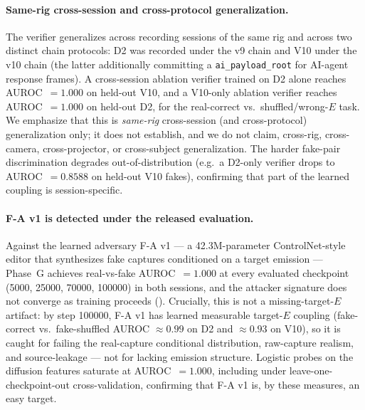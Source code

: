 \paragraph{Same-rig cross-session and cross-protocol generalization.}
The verifier generalizes across recording sessions of the same rig and across two distinct chain protocols: D2 was recorded under the v9 chain and V10 under the v10 chain (the latter additionally committing a \texttt{ai\_payload\_root} for AI-agent response frames). A cross-session ablation verifier trained on D2 alone reaches AUROC~$=1.000$ on held-out V10, and a V10-only ablation verifier reaches AUROC~$=1.000$ on held-out D2, for the real-correct vs.\ shuffled/wrong-$E$ task. We emphasize that this is \emph{same-rig} cross-session (and cross-protocol) generalization only; it does not establish, and we do not claim, cross-rig, cross-camera, cross-projector, or cross-subject generalization. The harder fake-pair discrimination degrades out-of-distribution (e.g.\ a D2-only verifier drops to AUROC~$=0.8588$ on held-out V10 fakes), confirming that part of the learned coupling is session-specific.

\paragraph{F-A v1 is detected under the released evaluation.}
Against the learned adversary F-A v1 --- a \num{42.3}M-parameter ControlNet-style editor that synthesizes fake captures conditioned on a target emission --- Phase~G achieves real-vs-fake AUROC~$=1.000$ at every evaluated checkpoint (\num{5000}, \num{25000}, \num{70000}, \num{100000}) in both sessions, and the attacker signature does not converge as training proceeds (). Crucially, this is not a missing-target-$E$ artifact: by step \num{100000}, F-A v1 has learned measurable target-$E$ coupling (fake-correct vs.\ fake-shuffled AUROC $\approx 0.99$ on D2 and $\approx 0.93$ on V10), so it is caught for failing the real-capture conditional distribution, raw-capture realism, and source-leakage --- not for lacking emission structure. Logistic probes on the diffusion features saturate at AUROC~$=1.000$, including under leave-one-checkpoint-out cross-validation, confirming that F-A v1 is, by these measures, an easy target.

